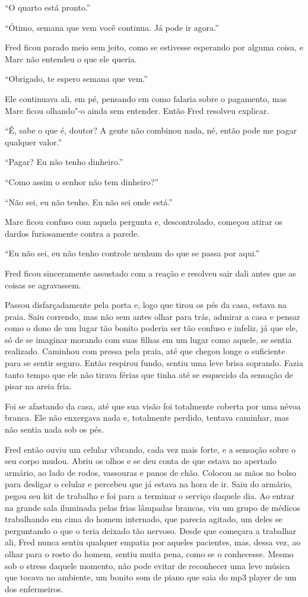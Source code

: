 ``O quarto está pronto.''

``Ótimo, semana que vem você continua. Já pode ir agora.''

Fred ficou parado meio sem jeito, como se estivesse esperando por alguma
coisa, e Marc não entendeu o que ele queria.

``Obrigado, te espero semana que vem.''

Ele continuava ali, em pé, pensando em como falaria sobre o pagamento,
mas Marc ficou olhando"-o ainda sem entender. Então Fred resolveu
explicar.

``É, sabe o que é, doutor? A gente não combinou nada, né, então pode me
pagar qualquer valor.''

``Pagar? Eu não tenho dinheiro.''

``Como assim o senhor não tem dinheiro?''

``Não sei, eu não tenho. Eu não sei onde está.''

Marc ficou confuso com aquela pergunta e, descontrolado,
começou atirar os dardos furiosamente contra a parede.

``Eu não sei, eu não tenho controle nenhum do que se passa por aqui.''

Fred ficou sinceramente assustado com a reação e resolveu sair dali
antes que as coisas se agravassem.

Passou disfarçadamente pela porta e, logo que tirou os pés da casa,
estava na praia. Saiu correndo, mas não sem antes olhar para trás,
admirar a casa e pensar como o dono de um lugar tão bonito poderia ser
tão confuso e infeliz, já que ele, só de se imaginar morando com suas
filhas em um lugar como aquele, se sentia realizado. Caminhou com pressa
pela praia, até que chegou longe o suficiente para se sentir seguro.
Então respirou fundo, sentiu uma leve brisa soprando. Fazia tanto tempo
que ele não tirava férias que tinha até se esquecido da sensação de
pisar na areia fria.

Foi se afastando da casa, até que sua visão foi totalmente coberta por
uma névoa branca. Ele não enxergava nada e, totalmente perdido, tentava
caminhar, mas não sentia nada sob os pés.

Fred então ouviu um celular vibrando, cada vez mais forte, e a sensação
sobre o seu corpo mudou. Abriu os olhos e se deu conta de que estava no
apertado armário, ao lado de rodos, vassouras e panos de chão. Colocou
as mãos no bolso para desligar o celular e percebeu que já estava na
hora de ir. Saiu do armário, pegou seu kit de trabalho e foi para a 
terminar o serviço daquele dia. Ao entrar na grande sala iluminada pelas
frias lâmpadas brancas, viu um grupo de médicos trabalhando em cima do
homem internado, que parecia agitado, um deles se perguntando o que o
teria deixado tão nervoso. Desde que começara a trabalhar ali, Fred
nunca sentiu qualquer empatia por aqueles pacientes, mas, dessa vez, ao
olhar para o rosto do homem, sentiu muita pena, como se o conhecesse.
Mesmo sob o stress daquele momento, não pode evitar de reconhecer
uma leve música que tocava no ambiente, um bonito som de piano que saia
do mp3 player de um dos enfermeiros.

